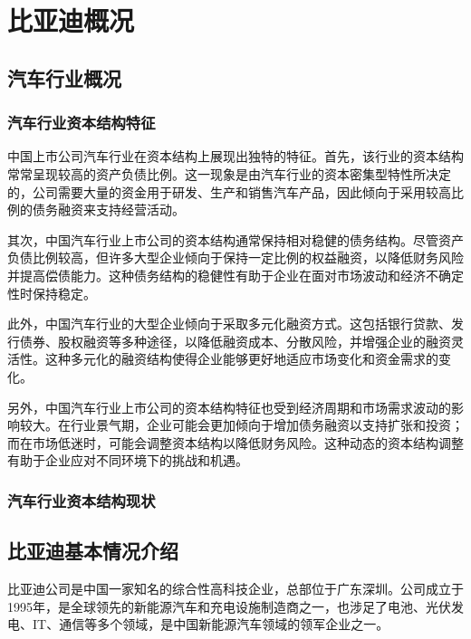 \chapter{比亚迪概况}
\section{汽车行业概况}
\subsection{汽车行业资本结构特征}
中国上市公司汽车行业在资本结构上展现出独特的特征。首先，该行业的资本结构常常呈现较高的资产负债比例。这一现象是由汽车行业的资本密集型特性所决定的，公司需要大量的资金用于研发、生产和销售汽车产品，因此倾向于采用较高比例的债务融资来支持经营活动。

其次，中国汽车行业上市公司的资本结构通常保持相对稳健的债务结构。尽管资产负债比例较高，但许多大型企业倾向于保持一定比例的权益融资，以降低财务风险并提高偿债能力。这种债务结构的稳健性有助于企业在面对市场波动和经济不确定性时保持稳定。

此外，中国汽车行业的大型企业倾向于采取多元化融资方式。这包括银行贷款、发行债券、股权融资等多种途径，以降低融资成本、分散风险，并增强企业的融资灵活性。这种多元化的融资结构使得企业能够更好地适应市场变化和资金需求的变化。

另外，中国汽车行业上市公司的资本结构特征也受到经济周期和市场需求波动的影响较大。在行业景气期，企业可能会更加倾向于增加债务融资以支持扩张和投资；而在市场低迷时，可能会调整资本结构以降低财务风险。这种动态的资本结构调整有助于企业应对不同环境下的挑战和机遇。
\subsection{汽车行业资本结构现状}



\section{比亚迪基本情况介绍}
比亚迪公司是中国一家知名的综合性高科技企业，总部位于广东深圳。公司成立于1995年，是全球领先的新能源汽车和充电设施制造商之一，也涉足了电池、光伏发电、IT、通信等多个领域，是中国新能源汽车领域的领军企业之一。

